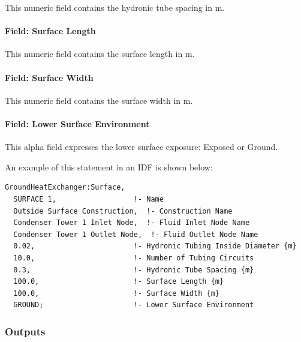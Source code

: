 This numeric field contains the hydronic tube spacing in m.

\paragraph{Field: Surface Length}\label{field-surface-length}

This numeric field contains the surface length in m.

\paragraph{Field: Surface Width}\label{field-surface-width}

This numeric field contains the surface width in m.

\paragraph{Field: Lower Surface Environment}\label{field-lower-surface-environment}

This alpha field expresses the lower surface exposure: Exposed or Ground.

An example of this statement in an IDF is shown below:

\begin{lstlisting}
GroundHeatExchanger:Surface,
  SURFACE 1,                  !- Name
  Outside Surface Construction,  !- Construction Name
  Condenser Tower 1 Inlet Node,  !- Fluid Inlet Node Name
  Condenser Tower 1 Outlet Node,  !- Fluid Outlet Node Name
  0.02,                       !- Hydronic Tubing Inside Diameter {m}
  10.0,                       !- Number of Tubing Circuits
  0.3,                        !- Hydronic Tube Spacing {m}
  100.0,                      !- Surface Length {m}
  100.0,                      !- Surface Width {m}
  GROUND;                     !- Lower Surface Environment
\end{lstlisting}

\subsubsection{Outputs}\label{outputs-13-000}


